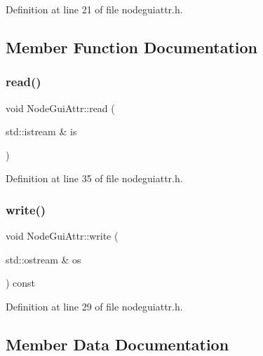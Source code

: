 Definition at line 21 of file nodeguiattr.\+h.



\subsection{Member Function Documentation}
\mbox{\label{struct_node_gui_attr_a7ce8e0863f88a40e242bc3ba71c37663}} 
\subsubsection{\texorpdfstring{read()}{read()}}
{\footnotesize\ttfamily void Node\+Gui\+Attr\+::read (\begin{DoxyParamCaption}\item[{std\+::istream \&}]{is }\end{DoxyParamCaption})\hspace{0.3cm}{\ttfamily [inline]}}



Definition at line 35 of file nodeguiattr.\+h.

\mbox{\label{struct_node_gui_attr_aabc33d777e16fd3640cf224edd4e0f9f}} 
\subsubsection{\texorpdfstring{write()}{write()}}
{\footnotesize\ttfamily void Node\+Gui\+Attr\+::write (\begin{DoxyParamCaption}\item[{std\+::ostream \&}]{os }\end{DoxyParamCaption}) const\hspace{0.3cm}{\ttfamily [inline]}}



Definition at line 29 of file nodeguiattr.\+h.



\subsection{Member Data Documentation}
\mbox{\label{struct_node_gui_attr_aad75cafcb74b64f13842efc6b3c755d1}} 
